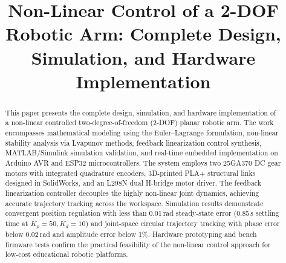 \documentclass[conference]{IEEEtran}
\begin{document}
\title{Non-Linear Control of a 2-DOF Robotic Arm: Complete Design, Simulation, and Hardware Implementation}

\author{
\and
{}
\and
{}
\and
{}
\and
{}
\and
{}
}

\maketitle

\begin{abstract}
This paper presents the complete design, simulation, and hardware implementation of a non-linear controlled two-degree-of-freedom (2-DOF) planar robotic arm. The work encompasses mathematical modeling using the Euler--Lagrange formulation, non-linear stability analysis via Lyapunov methods, feedback linearization control synthesis, MATLAB/Simulink simulation validation, and real-time embedded implementation on Arduino AVR and ESP32 microcontrollers. The system employs two 25GA370 DC gear motors with integrated quadrature encoders, 3D-printed PLA+ structural links designed in SolidWorks, and an L298N dual H-bridge motor driver. The feedback linearization controller decouples the highly non-linear joint dynamics, achieving accurate trajectory tracking across the workspace. Simulation results demonstrate convergent position regulation with less than 0.01\,rad steady-state error ($0.85$\,s settling time at $K_p = 50, K_d = 10$) and joint-space circular trajectory tracking with phase error below 0.02\,rad and amplitude error below 1\%. Hardware prototyping and bench firmware tests confirm the practical feasibility of the non-linear control approach for low-cost educational robotic platforms.
\end{abstract}
\end{document}
